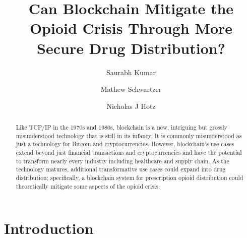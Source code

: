 \documentclass[sigconf]{acmart}
\begin{document}
\title{Can Blockchain Mitigate the Opioid Crisis Through More Secure Drug Distribution?}


\author{Saurabh Kumar}

\author{Mathew Schwartzer}

\author{Nicholas J Hotz}

\begin{abstract}
Like TCP/IP in the 1970s and 1980s, blockchain is a new, intriguing but grossly misunderstood technology that is still in its infancy. It is commonly misunderstood as just a technology for Bitcoin and cryptocurrencies. However, blockchain's use cases extend beyond just financial transactions and cryptocurrencies and have the potential to transform nearly every industry including healthcare and supply chain. As the technology matures, additional transformative use cases could expand into drug distribution; specifically, a blockchain system for prescription opioid distribution could theoretically mitigate some aspects of the opioid crisis.  
\end{abstract}


\maketitle

\section{Introduction}
\end{document}
